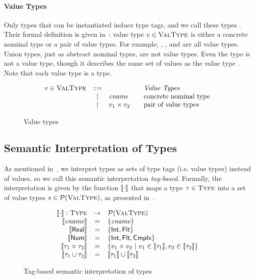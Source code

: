 \paragraph{Value Types}
Only types that can be instantiated induce type tags,
and we call these types . 
Their formal definition is given in~:
value type $v \in \textsc{ValType}$ is either a concrete nominal type 
or a pair of value types. 
For example, \tyflt, \typair{\tyint}{\tyint},
and \typair{\tystr}{(\typair{\tyint}{\tyint})} are all value types.
Union types, just as abstract nominal types, are not value types.
Even the type \tyunion{\tyint}{\tyint} is not a value type, 
though it describes the same set of values as the value type \tyint.
Note that each value type is a type. %

\begin{figure}
	\[
	\begin{array}{rcl@{\qquad}l}
	\vty \in \VType & ::= & & \text{\emph{Value Types}}
	\\ &\Alt& \cname & \text{concrete nominal type}
	\\ &\Alt& \typair{\vty_1}{\vty_2} & \text{pair of value types}
	\end{array}
	\]
	\caption{Value types} %
	\label{fig:bjsem-value-types}
\end{figure}


\subsection{Semantic Interpretation of Types}

As mentioned in~, 
we interpret types as sets of type tags (i.e. value types) instead of values,
so we call this semantic interpretation \emph{tag-based}.
Formally, the interpretation is given by the function
$\llbracket \cdot \rrbracket$ that maps a type $\tau \in \textsc{Type}$
into a set of value types $s \in \mathcal{P}(\textsc{ValType})$,
as presented in~.

\begin{figure}
	\[
	\begin{array}{rcl}
	\llbracket \cdot \rrbracket: \textsc{Type} &\rightarrow& \mathcal{P}(\textsc{ValType}) \\
	\llbracket \mathit{cname} \rrbracket  & = & \{\mathit{cname}\} \\
	\llbracket \mathsf{Real} \rrbracket & = & \{ \mathsf{Int}, \mathsf{Flt} \} \\
	\llbracket \mathsf{Num} \rrbracket & = & \{ \mathsf{Int}, \mathsf{Flt}, \mathsf{Cmplx} \} \\
	\llbracket \tau_1 \times \tau_2 \rrbracket & = & \{v_1 \times v_2 
	~\vert~ v_1 \in \llbracket \tau_1 \rrbracket, v_2 \in \llbracket \tau_2 \rrbracket\}\\
	\llbracket \tau_1 \cup \tau_2 \rrbracket & = & 
	\llbracket \tau_1 \rrbracket \cup \llbracket \tau_2 \rrbracket
	\end{array}
	\]
	\caption{Tag-based semantic interpretation of types} %
	\label{fig:bjsem-interpretation}
\end{figure}


